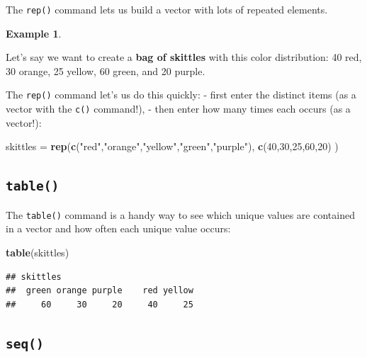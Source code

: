 \documentclass[
]{book}
\newenvironment{Shaded}{\begin{snugshade}}{\end{snugshade}}
\newcommand{\DecValTok}[1]{\textcolor[rgb]{0.00,0.00,0.81}{#1}}
\newcommand{\FunctionTok}[1]{\textcolor[rgb]{0.13,0.29,0.53}{\textbf{#1}}}
\newcommand{\NormalTok}[1]{#1}
\newcommand{\OtherTok}[1]{\textcolor[rgb]{0.56,0.35,0.01}{#1}}
\newcommand{\StringTok}[1]{\textcolor[rgb]{0.31,0.60,0.02}{#1}}
\theoremstyle{definition}
\theoremstyle{definition}
\newtheorem{example}{Example}[chapter]
\theoremstyle{definition}
\theoremstyle{definition}
\theoremstyle{remark}
\begin{document}
The \texttt{rep()} command lets us build a vector with lots of repeated elements.

\begin{example}
\protect\hypertarget{exm:skittles}{}\label{exm:skittles}

Let's say we want to create a \textbf{bag of skittles} with this color distribution: 40 red, 30 orange, 25 yellow, 60 green, and 20 purple.

The \texttt{rep()} command let's us do this quickly:
- first enter the distinct items (as a vector with the \texttt{c()} command!),
- then enter how many times each occurs (as a vector!):

\begin{Shaded}
\begin{Highlighting}[]
\NormalTok{skittles }\OtherTok{=} \FunctionTok{rep}\NormalTok{(}\FunctionTok{c}\NormalTok{(}\StringTok{"red"}\NormalTok{,}\StringTok{"orange"}\NormalTok{,}\StringTok{"yellow"}\NormalTok{,}\StringTok{"green"}\NormalTok{,}\StringTok{"purple"}\NormalTok{),}
               \FunctionTok{c}\NormalTok{(}\DecValTok{40}\NormalTok{,}\DecValTok{30}\NormalTok{,}\DecValTok{25}\NormalTok{,}\DecValTok{60}\NormalTok{,}\DecValTok{20}\NormalTok{)}
\NormalTok{               )}
\end{Highlighting}
\end{Shaded}

\end{example}

\subsection*{\texorpdfstring{\texttt{table()}}{table()}}\label{table}

The \texttt{table()} command is a handy way to see which unique values are contained in a vector and how often each unique value occurs:

\begin{Shaded}
\begin{Highlighting}[]
\FunctionTok{table}\NormalTok{(skittles)}
\end{Highlighting}
\end{Shaded}

\begin{verbatim}
## skittles
##  green orange purple    red yellow 
##     60     30     20     40     25
\end{verbatim}

\subsection*{\texorpdfstring{\texttt{seq()}}{seq()}}\label{seq}
\end{document}
